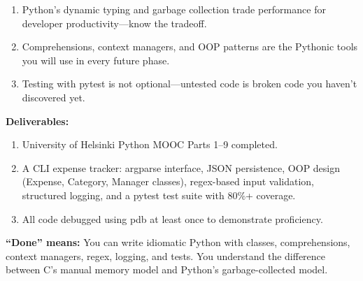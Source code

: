 \documentclass[11pt, a4paper, oneside]{report}
\begin{document}
\begin{takeawaybox}
\begin{enumerate}[leftmargin=*]
\item Python's dynamic typing and garbage collection trade performance for developer productivity---know the tradeoff.
\item Comprehensions, context managers, and OOP patterns are the Pythonic tools you will use in every future phase.
\item Testing with pytest is not optional---untested code is broken code you haven't discovered yet.
\end{enumerate}
\end{takeawaybox}

\begin{milestonebox}
\textbf{Deliverables:}
\begin{enumerate}[leftmargin=*]
\item University of Helsinki Python MOOC Parts 1--9 completed.
\item A CLI expense tracker: argparse interface, JSON persistence, OOP design (Expense, Category, Manager classes), regex-based input validation, structured logging, and a pytest test suite with 80\%+ coverage.
\item All code debugged using pdb at least once to demonstrate proficiency.
\end{enumerate}

\textbf{``Done'' means:} You can write idiomatic Python with classes, comprehensions, context managers, regex, logging, and tests. You understand the difference between C's manual memory model and Python's garbage-collected model.
\end{milestonebox}
\end{document}
